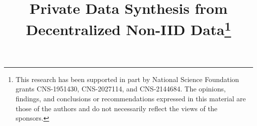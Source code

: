 \documentclass[conference]{IEEEtran}
\begin{document}


\title{Private Data Synthesis from  Decentralized Non-IID Data\thanks{This research has been supported in part by National Science Foundation grants CNS-1951430, CNS-2027114, and CNS-2144684.  The opinions, findings, and conclusions or recommendations expressed in this material are those of the authors and do not necessarily reflect the views of the sponsors. }
}

\author{
\and
{}

}





\end{document}
